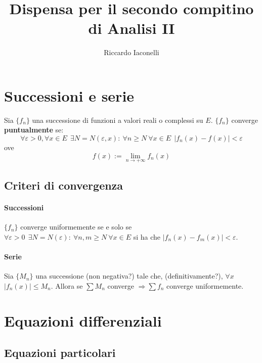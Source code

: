 \documentclass[a4paper,12pt]{article}
\begin{document}
\begin{titlepage}
\title{Dispensa per il secondo compitino di Analisi II}
\author{Riccardo Iaconelli}
\maketitle
\end{titlepage}

\begin{titlepage}
\tableofcontents
\end{titlepage}

\section{Successioni e serie}

Sia $\{f_n\}$ una successione di funzioni a valori reali o complessi su $E$.
$\{f_n\}$ converge \textbf{puntualmente} se: $$\forall \varepsilon>0, \forall x \in E\ \ \exists N=N(\varepsilon, x):\ \forall n \geq N\ \forall x\in E\ \ |f_n(x) - f(x)| < \varepsilon$$ ove $$f(x):=\lim_{n\to+\infty} f_n(x)$$
\subsection{Criteri di convergenza}

\paragraph{Successioni}
$\{f_n\}$ converge uniformemente se e solo se $\forall \varepsilon>0\ \ \exists N=N(\varepsilon):\ \forall n,m \geq N\ \forall x\in E$ si ha che $|f_n(x) - f_m(x)| < \varepsilon$.

\paragraph{Serie}
Sia $\{M_n\}$ una successione (non negativa?) tale che, (definitivamente?), $\forall x$ $|f_n(x)|\leq M_n$. Allora se $\sum M_n$ converge $\Rightarrow\sum f_n$ converge uniformemente.



\section{Equazioni differenziali}

\subsection{Equazioni particolari}
\end{document}
